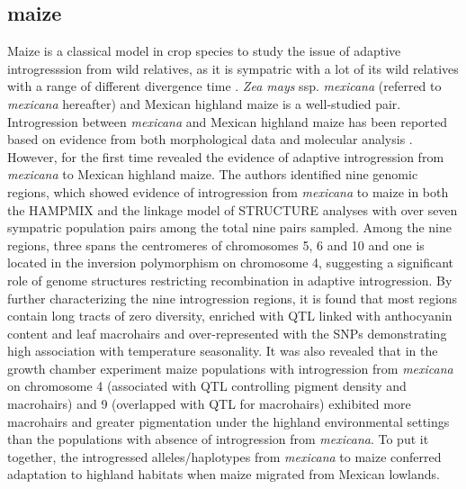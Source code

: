 \documentclass[11pt]{article}
\begin{document}
\subsection{maize}
Maize is a classical model in crop species to study the issue of adaptive introgresssion from wild relatives, as it is sympatric with a lot of its wild relatives with a range of different divergence time \cite{hufford2013}.
\emph{Zea mays} ssp. \emph{mexicana} (referred to \emph{mexicana} hereafter) and Mexican highland maize is a well-studied pair.
Introgression between \emph{mexicana} and Mexican highland maize has been reported based on evidence from both morphological data \cite {wilkes1977, lauter2004, doebley1984} and molecular analysis \cite{matsuoka2002, vanHeerwaarden2011, doebley1987, warburton2011, fukunaga2005}.
However, \citep{hufford2013} for the first time revealed the evidence of adaptive introgression from \emph{mexicana} to Mexican highland maize.
The authors identified nine genomic regions, which showed evidence of introgression from \emph{mexicana} to maize in both the HAMPMIX and the linkage model of STRUCTURE analyses with over seven sympatric population pairs among the total nine pairs sampled. 
Among the nine regions, three spans the centromeres of chromosomes 5, 6 and 10 and one is located in the inversion polymorphism on chromosome 4, suggesting a significant role of genome structures restricting recombination in adaptive introgression.
By further characterizing the nine introgression regions, it is found that most regions contain long tracts of zero diversity, enriched with QTL linked with anthocyanin content and leaf macrohairs \cite{lauter2004} and over-represented with the SNPs demonstrating high association with temperature seasonality.
It was also revealed that in the growth chamber experiment maize populations with introgression from \emph{mexicana} on chromosome 4 (associated with QTL controlling pigment density and macrohairs) and 9 (overlapped with QTL for macrohairs) exhibited more macrohairs and greater pigmentation under the highland environmental settings than the populations with absence of introgression from \emph{mexicana}.
To put it together, the introgressed alleles/haplotypes from \emph{mexicana} to maize conferred adaptation to highland habitats when maize migrated from Mexican lowlands.
\end{document}
